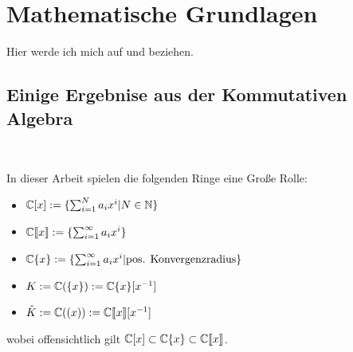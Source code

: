 \chapter{Mathematische Grundlagen}

Hier werde ich mich auf \cite{sabbah_cimpa90} und \cite{coutinho1995primer} beziehen.

\section{Einige Ergebnise aus der Kommutativen Algebra}~

In dieser Arbeit spielen die folgenden Ringe eine Große Rolle:
\begin{itemize}
  \item ${\mathbb C}[x]:=\{ \sum^{N}_{i=1}a_ix^i | N\in {\mathbb N} \}$
  \item ${\mathbb C}\llbracket x\rrbracket:=\{ \sum^{\infty}_{i=1}a_ix^i \}$
  \item ${\mathbb C}\{x\}:=\{ \sum^{\infty}_{i=1}a_ix^i | \mbox{pos.
        Konvergenzradius} \}$
  \item $K:={\mathbb C}(\{x\}):={\mathbb C}\{x\}[x^{-1}]$
  \item $\hat{K}:={\mathbb C}((x)):={\mathbb C}\llbracket x\rrbracket[x^{-1}]$
\end{itemize}

wobei offensichtlich gilt ${\mathbb C}[x]\subset{\mathbb C}\{x\}\subset{\mathbb C}\llbracket x\rrbracket$.

\begin{comment}
  \begin{lem}[Seite 2]
    ein paar eigenschaften
    \begin{enumerate}
      \item $\C[x]$ ist ein graduierter Ring, durch die Grad der
        Polynome. Diese graduierung induziert eine aufsteigende Filtrierung.

        alle Ideale haben die form $(x-a)$ mit $,a\in \C$
      \item wenn $\mathfrak{m}$ das maximale Ideal von $\C[x]$ (erzeugt von
        $x$ ist), so ist
        \[
          \C[[x]]=
          \underset{k}{\underleftarrow{\lim}} \C[X]\backslash\mathfrak{m}^k
        \]
        The ring $\C[[x]]$ ist ein nöterscher lokaler Ring:
        jede Potenzreihe mit konstantem term $\neq0$ ist invertierbar.

        Der ring ist ebenfalls ein diskreter ??? Ring (discrete valuation
        ring)

        Die Filtrierung nach grad des Maximalen Ideals, genannt
        $\mathfrak{m}$-adische Fitration, ist die Filtrierung
        $\mathfrak{m}^k=\{f\in \C[[x]]|v(f)\geq k\}$

        und es gilt $gr_\mathfrak{m}(\C[[x]])=\C[x]$
      \item $\C\{x\}\subset \C[[x]]$ ist ein Untering der Potenzreihen, wobei
        der Konvergenzradius echt positiv ist.

        ist ähnlich zu $\C[[x]]$
    \end{enumerate}
  \end{lem}
\end{comment}


